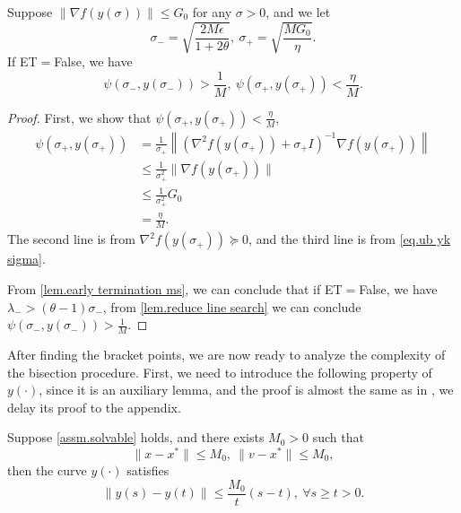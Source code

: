 \documentclass{article}
\begin{document}
\begin{lemma}
    \label{lem.bracketing points}
    Suppose $\|\nabla f(y(\sigma))\|\leq G_0$ for any $\sigma>0$, and we let 
    \begin{equation}
        \label{eq.bracket points}
        \sigma_- = \sqrt{\frac{2M\epsilon}{1+2\theta}}, \ \sigma_+ = \sqrt{\frac{MG_0}{\eta}}.
    \end{equation}
    If ET$=$False, we have
    \begin{equation*}
        \psi\left (\sigma_-,y(\sigma_-)\right) >\frac{1}{M}, \ \psi\left (\sigma_+,y(\sigma_+)\right) <\frac{\eta}{M}.
    \end{equation*}
\end{lemma}
\begin{proof}
    First, we show that $\psi(\sigma_+,y(\sigma_+))<\frac{\eta}{M}$,
    \begin{equation*}
        \begin{aligned}
        \psi(\sigma_+,y(\sigma_+)) &= \frac{1}{\sigma_+}\left \|\left(\nabla^2 f(y(\sigma_+))+\sigma_+ I\right)^{-1}\nabla f(y(\sigma_+))\right\| \\
        &\leq \frac{1}{\sigma_+^2}\|\nabla f(y(\sigma_+))\| \\
        &\leq \frac{1}{\sigma_+^2} G_0\\
        &= \frac{\eta}{M}.
        \end{aligned}
    \end{equation*}
    The second line is from $\nabla^2 f(y(\sigma_+))\succeq 0$, and the third line is from \eqref{eq.ub yk sigma}. 
    
    From \autoref{lem.early termination ms}, we can conclude that if ET$=$False, we have $\lambda_- > (\theta-1)\sigma_-$, from \autoref{lem.reduce line search} we can conclude $\psi(\sigma_-,y(\sigma_-))>\frac{1}{M}.$
\end{proof}
After finding the bracket points, we are now ready to analyze the complexity of the bisection procedure. First, we need to introduce the following property of $y(\cdot)$, since it is an auxiliary lemma, and the proof is almost the same as in \citet{monteiro2013accelerated}, we delay its proof to the appendix.
\begin{lemma}
\label{lem.curve condition}
    Suppose \autoref{assm.solvable} holds, and there exists $M_0>0$ such that
    \begin{equation}\label{eq.bounded assm point}
        \|x-x^*\|\leq M_0, \ \|v-x^*\|\leq M_0,
    \end{equation}
    then the curve $y(\cdot)$ satisfies
    \begin{equation}
        \label{eq.curve condition}
        \|y(s)-y(t)\| \leq \frac{M_0}{t}(s-t), \ \forall s\geq t >0.
    \end{equation}
\end{lemma}
\end{document}

